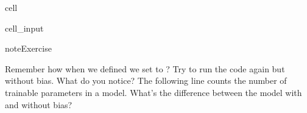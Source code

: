 \documentclass[letterpaper,10pt,english]{jupyterBook}
\begin{document}
\begin{sphinxuseclass}{cell}\begin{sphinxVerbatimInput}

\begin{sphinxuseclass}{cell_input}
\begin{sphinxVerbatim}[commandchars=\\\{\}]

 
      
  
   
 
 
\end{sphinxVerbatim}

\end{sphinxuseclass}\end{sphinxVerbatimInput}

\end{sphinxuseclass}
\begin{sphinxadmonition}{note}{Exercise}

\sphinxAtStartPar
Remember how when we defined  we set  to ? Try to run the code again but without bias. What do you notice? The following line counts the number of trainable parameters in a model. What’s the difference between the model with and without bias?
\end{sphinxadmonition}
\end{document}
